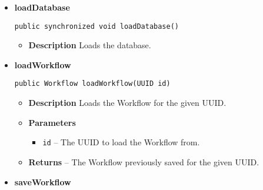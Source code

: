 \documentclass[11pt,a4paper]{report}
\begin{document}
{{{{{{{{{{\begin{itemize}
{\begin{itemize}
{\begin{itemize}
									\item{\texttt{userID} -- The user ID to get the Workflow ID's from.}
								\end{itemize}
							}%
							\item{
								{\bf  Returns} 
								-- A Collection of all Workflow IDs associated with the given user. 
							}%
						\end{itemize}
					}%
					\item{ 
						\hypertarget{studyplanning.model.DataIO.loadDatabase()}{{\bf  loadDatabase}\\}
						\begin{lstlisting}[frame=none]
public synchronized void loadDatabase()
						\end{lstlisting} %
						\begin{itemize}
							\item{
								{\bf  Description}
								Loads the database.
							}
						\end{itemize}
					}%
					\item{ 
						\hypertarget{studyplanning.model.DataIO.loadWorkflow(java.util.UUID)}{{\bf  loadWorkflow}\\}
						\begin{lstlisting}[frame=none]
public Workflow loadWorkflow(UUID id)
						\end{lstlisting} %
						\begin{itemize}
							\item{
								{\bf  Description}
								Loads the Workflow for the given UUID.
							}
							\item{
								{\bf  Parameters}
								\begin{itemize}
									\item{\texttt{id} -- The UUID to load the Workflow from.}
								\end{itemize}
							}%
							\item{
								{\bf  Returns} 
								-- The Workflow previously saved for the given UUID. 
							}%
						\end{itemize}
					}%
					\item{ 
						\hypertarget{studyplanning.model.DataIO.saveWorkflow(studyplanning.model.workflow.Workflow, java.util.UUID)}{{\bf  saveWorkflow}\\}
						\begin{lstlisting}[frame=none]

\end{lstlisting}}
\end{itemize}}}}}}}}}}}
\end{document}

